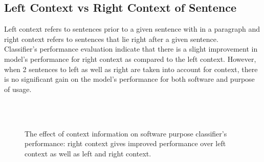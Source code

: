 \subsection{Left Context vs Right Context of Sentence}
\label{sec:chapter06:leftvsright}

Left context refers to sentences prior to a given sentence with in  a paragraph and right context refers to sentences that lie right after a given sentence. \\

Classifier’s performance evaluation indicate that there is a slight improvement in model’s performance for right context as compared to the left context. However, when 2 sentences to left as well as right are taken into account for context, there is no significant gain on the model’s performance for both software and purpose of usage. \\

\begin{figure}[h]
	
	\myfloatalign
	
	 \\
	\\
	\caption{The effect of context information on software purpose classifier's performance: right context gives improved performance over left context as well as left and right context.}
\end{figure}

